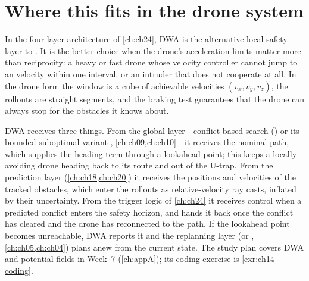 \section{Where this fits in the drone system}
\label{sec:ch14-drone}

\begin{dronebox}
In the four-layer architecture of \cref{ch:ch24}, DWA is the alternative
local safety layer to \orca. It is the better choice when the drone's
acceleration limits matter more than reciprocity: a heavy or fast drone
whose velocity controller cannot jump to an \orca velocity within one
interval, or an intruder that does not cooperate at all. In the drone form
the window is a cube of achievable velocities $(v_x, v_y, v_z)$, the
rollouts are straight segments, and the braking test guarantees that the
drone can always stop for the obstacles it knows about.

DWA receives three things. From the global layer---conflict-based search
(\cbs) or its bounded-suboptimal variant \ecbs, \cref{ch:ch09,ch:ch10}---it
receives the nominal path, which supplies the
heading term through a lookahead point; this keeps a locally avoiding drone
heading back to its route and out of the U-trap. From the prediction layer
(\cref{ch:ch18,ch:ch20}) it receives the positions and velocities of the
tracked obstacles, which enter the rollouts as relative-velocity ray casts,
inflated by their uncertainty. From the trigger logic of \cref{ch:ch24} it
receives control when a predicted conflict enters the safety horizon, and
hands it back once the conflict has cleared and the drone has reconnected to
the path. If the lookahead point becomes unreachable, DWA reports it and the
replanning layer (\dstarlite or \astar, \cref{ch:ch05,ch:ch04}) plans anew
from the current state. The study plan covers DWA and potential fields in
Week~7 (\cref{ch:appA}); its coding exercise is \cref{exr:ch14-coding}.
\end{dronebox}

